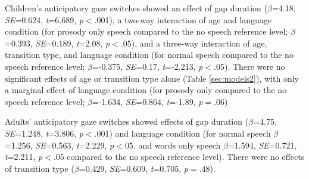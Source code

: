 \documentclass[authoryear, 12pt]{elsarticle}
\begin{document}
Children's anticipatory gaze switches showed an effect of gap duration (\textit{$\beta$}=4.18, \textit{SE}=0.624, \textit{t}=6.689, \textit{p}$<$.001), a two-way interaction of age and language condition (for prosody only speech compared to the no speech reference level; \textit{$\beta$}=0.393, \textit{SE}=0.189, \textit{t}=2.08, \textit{p}$<$.05), and a three-way interaction of age, transition type, and language condition (for normal speech compared to the no speech reference level; \textit{$\beta$}=-0.375, \textit{SE}=0.17, \textit{t}=-2.213, \textit{p}$<$.05). There were no significant effects of age or transition type alone (Table \ref{sec:models2}), with only a marginal effect of language condition (for prosody only compared to the no speech reference level; \textit{$\beta$}=-1.634, \textit{SE}=0.864, \textit{t}=-1.89, \textit{p}$=$.06)

Adults' anticipatory gaze switches showed effects of gap duration (\textit{$\beta$}=4.75, \textit{SE}=1.248, \textit{t}=3.806, \textit{p}$<$.001) and language condition (for normal speech \textit{$\beta$}=1.256, \textit{SE}=0.563, \textit{t}=2.229, \textit{p}$<$05. and words only speech \textit{$\beta$}=1.594, \textit{SE}=0.721, \textit{t}=2.211, \textit{p}$<$.05  compared to the no speech reference level). There were no effects of transition type (\textit{$\beta$}=0.429, \textit{SE}=0.609, \textit{t}=0.705, \textit{p}$=$.48).
\end{document}
